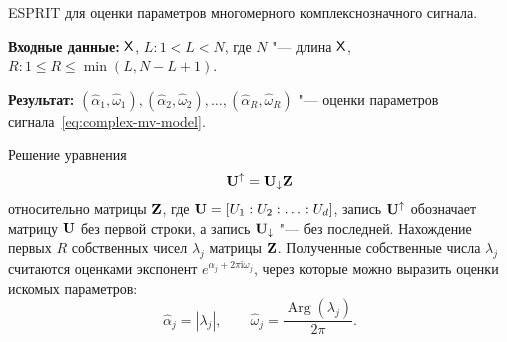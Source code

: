 \documentclass{article}
\theoremstyle{plain}
\theoremstyle{definition}
\theoremstyle{remark}
\newcommand{\Input}{\textbf{Входные данные: }}
\newcommand{\Output}{\textbf{Результат: }}
\newcommand{\iu}{\mathrm{i}}
\begin{document}
\begin{algorithm}[!h]
  \caption{ESPRIT для оценки параметров многомерного комплекснозначного сигнала.}
  \label{alg:esprit}
  \Input $\mathsf{X}$, $L: 1 < L < N$, где $N$ "--- длина $\mathsf{X}$, $R: 1 \leqslant R\leqslant \min(L, N-L+1)$.

  \Output $\left(\widehat{\alpha}_1, \widehat{\omega}_1\right),
  \left(\widehat{\alpha}_2, \widehat{\omega}_2\right), \ldots,
  \left(\widehat{\alpha}_R, \widehat{\omega}_R\right)$ "--- оценки параметров
  сигнала~\eqref{eq:complex-mv-model}.
  \begin{algorithmic}[1]
    \setcounter{ALG@line}{2}

    \State Решение уравнения
    \[
      \mathbf{U}^{\uparrow}=\mathbf{U}_{\downarrow}\mathbf{Z}
    \]
    относительно матрицы $\mathbf{Z}$, где $\mathbf{U} = [U_1:U_2:\ldots: U_d]$,
    запись $\mathbf{U}^{\uparrow}$ обозначает матрицу $\mathbf{U}$ без первой строки, а
    запись $\mathbf{U}_{\downarrow}$ "--- без последней.
    \State Нахождение первых $R$ собственных чисел $\lambda_j$ матрицы $\mathbf{Z}$.
    Полученные собственные числа $\lambda_j$ считаются оценками
    экспонент $e^{\alpha_j + 2\pi\iu \omega_j}$, через которые можно выразить
    оценки искомых параметров:
    \[
      \widehat{\alpha}_j = \left|\lambda_j\right|, \qquad
      \widehat{\omega}_j = \frac{\operatorname{Arg}\left(\lambda_j\right)}{2 \pi}.
    \]
  \end{algorithmic}
\end{algorithm}



\end{document}
